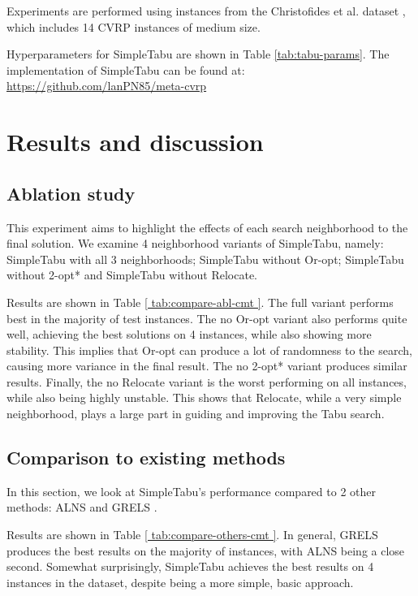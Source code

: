 \documentclass[12pt]{report}
\begin{document}
Experiments are performed using instances from the Christofides et al. dataset \cite{christofides1976vehicle}, which includes 14 CVRP instances of medium size.

Hyperparameters for SimpleTabu are shown in Table \ref{tab:tabu-params}. The implementation of SimpleTabu can be found at: \href{https://github.com/lanPN85/meta-cvrp}{https://github.com/lanPN85/meta-cvrp}



\section{Results and discussion}
\subsection{Ablation study}
This experiment aims to highlight the effects of each search neighborhood to the final solution. We examine 4 neighborhood variants of SimpleTabu, namely: SimpleTabu with all 3 neighborhoods; SimpleTabu without Or-opt; SimpleTabu without 2-opt* and SimpleTabu without Relocate.

Results are shown in Table \ref{ tab:compare-abl-cmt }. The full variant performs best in the majority of test instances. The no Or-opt variant also performs quite well, achieving the best solutions on 4 instances, while also showing more stability. This implies that Or-opt can produce a lot of randomness to the search, causing more variance in the final result. The no 2-opt* variant produces similar results. Finally, the no Relocate variant is the worst performing on all instances, while also being highly unstable. This shows that Relocate, while a very simple neighborhood, plays a large part in guiding and improving the Tabu search.



\subsection{Comparison to existing methods}
In this section, we look at SimpleTabu's performance compared to 2 other methods: ALNS \cite{pisinger2007general} and GRELS \cite{prins2009grasp}.



Results are shown in Table \ref{ tab:compare-others-cmt }. In general, GRELS produces the best results on the majority of instances, with ALNS being a close second. Somewhat surprisingly, SimpleTabu achieves the best results on 4 instances in the dataset, despite being a more simple, basic approach.
\end{document}
